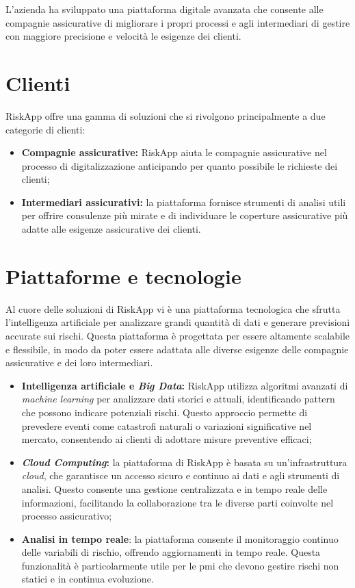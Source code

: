 L'azienda ha sviluppato una piattaforma digitale avanzata che consente alle compagnie assicurative di migliorare i propri processi e agli intermediari di gestire con maggiore precisione e velocità le esigenze dei clienti.

\section{Clienti}
RiskApp offre una gamma di soluzioni che si rivolgono principalmente a due categorie di clienti:
\begin{itemize}
	\item \textbf{Compagnie assicurative:} RiskApp aiuta le compagnie assicurative nel processo di digitalizzazione anticipando per quanto possibile le richieste dei clienti;
	\item \textbf{Intermediari assicurativi:} la piattaforma fornisce strumenti di analisi utili per offrire consulenze più mirate e di individuare le coperture assicurative più adatte alle esigenze assicurative dei clienti.
\end{itemize}

\section{Piattaforme e tecnologie}
Al cuore delle soluzioni di RiskApp vi è una piattaforma tecnologica che sfrutta l'intelligenza artificiale per analizzare grandi quantità di dati e generare previsioni accurate sui rischi. Questa piattaforma è progettata per essere altamente scalabile e flessibile, in modo da poter essere adattata alle diverse esigenze delle compagnie assicurative e dei loro intermediari.

\begin{itemize}
	\item \textbf{Intelligenza artificiale e \textit{Big Data}:} RiskApp utilizza algoritmi avanzati di \textit{machine learning} per analizzare dati storici e attuali, identificando pattern che possono indicare potenziali rischi. Questo approccio permette di prevedere eventi come catastrofi naturali o variazioni significative nel mercato, consentendo ai clienti di adottare misure preventive efficaci;
	\item \textbf{\textit{Cloud Computing}:} la piattaforma di RiskApp è basata su un'infrastruttura \textit{cloud}, che garantisce un accesso sicuro e continuo ai dati e agli strumenti di analisi. Questo consente una gestione centralizzata e in tempo reale delle informazioni, facilitando la collaborazione tra le diverse parti coinvolte nel processo assicurativo;
	\item \textbf{Analisi in tempo reale}: la piattaforma consente il monitoraggio continuo delle variabili di rischio, offrendo aggiornamenti in tempo reale. Questa funzionalità è particolarmente utile per le \gls{pmi} che devono gestire rischi non statici e in continua evoluzione.
\end{itemize}

